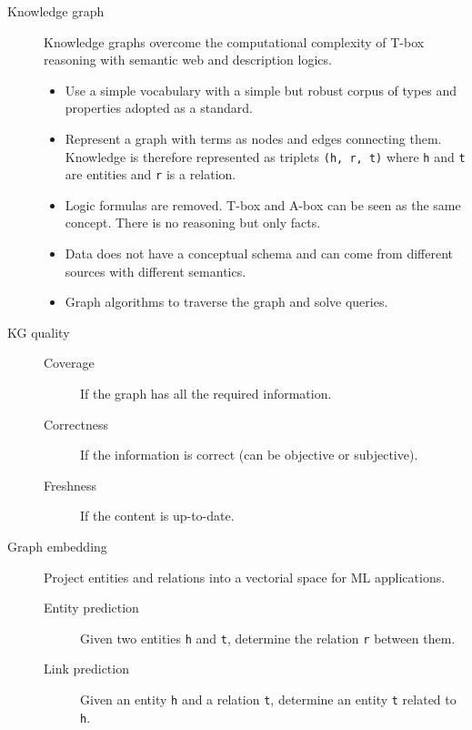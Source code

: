 \begin{description}
    \item[Knowledge graph] 
        Knowledge graphs overcome the computational complexity of T-box reasoning with semantic web and description logics.

        \begin{itemize}
            \item Use a simple vocabulary with a simple but robust corpus of types and properties adopted as a standard.
            \item Represent a graph with terms as nodes and edges connecting them.
                Knowledge is therefore represented as triplets \texttt{(h, r, t)} where \texttt{h} and \texttt{t} are entities and \texttt{r} is a relation.
            \item Logic formulas are removed. T-box and A-box can be seen as the same concept. There is no reasoning but only facts.
            \item Data does not have a conceptual schema and can come from different sources with different semantics.
            \item Graph algorithms to traverse the graph and solve queries.
        \end{itemize}

    \item[KG quality] 
        \begin{description}
            \item[Coverage] If the graph has all the required information.
            \item[Correctness] If the information is correct (can be objective or subjective).
            \item[Freshness] If the content is up-to-date.
        \end{description}

    \item[Graph embedding] 
        Project entities and relations into a vectorial space for ML applications.
        \begin{description}
            \item[Entity prediction] Given two entities \texttt{h} and \texttt{t}, determine the relation \texttt{r} between them.
            \item[Link prediction] Given an entity \texttt{h} and a relation \texttt{t}, determine an entity \texttt{t} related to \texttt{h}.
        \end{description}
\end{description}